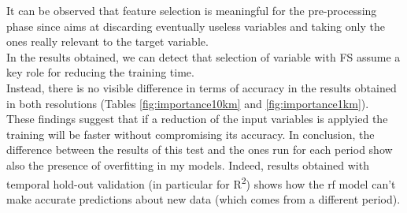 It can be observed that feature selection is meaningful for the pre-processing phase since aims at discarding eventually useless variables and taking only the ones really relevant to the target variable. \\
In the results obtained, we can detect that selection of variable with FS assume a key role for reducing the training time.\\ 
Instead, there is no visible difference in terms of accuracy in the results obtained in both resolutions (Tables \ref{fig:importance10km} and \ref{fig:importance1km}).\\
These findings suggest that if a reduction of the input variables is applyied the training will be faster without compromising its accuracy.
In conclusion, the difference between the results of this test and the ones run for each period show also the presence of overfitting in my models. Indeed, results obtained with temporal hold-out validation (in particular for  R\textsuperscript{2}) shows how the \acrshort{rf} model can't make accurate predictions about new data (which comes from a different period).  

\begin{table}[H]
\centering
{}
\\
\caption{Random Forest prediction for PM2.5, including zones with mountains using or not FS.}
\end{table}